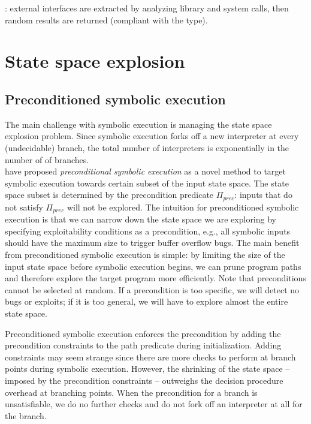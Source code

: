 \cite{DART-PLDI05}: external interfaces are extracted by analyzing library and system calls, then random results are returned (compliant with the type).

\section{State space explosion}

\subsection{Preconditioned symbolic execution~\cite{AEG-NDSS11}}
\label{precontioned-symbolic-execution}

The main challenge with symbolic execution is managing the state space explosion problem. Since symbolic execution forks off a new interpreter at every (undecidable) branch, the total number of interpreters is exponentially in the number of of branches.\\

\cite{AEG-NDSS11} have proposed {\em preconditional symbolic execution} as a novel method to target symbolic execution towards certain subset of the input state space. The state space subset is determined by the precondition predicate $\Pi_{prec}$: inputs that do not satisfy $\Pi_{prec}$ will not be explored. The intuition for preconditioned symbolic execution is that we can narrow down the state space we are exploring by specifying exploitability conditions as a precondition, e.g., all symbolic inputs should have the maximum size to trigger buffer overflow bugs. The main benefit from preconditioned symbolic execution is simple: by limiting the size of the input state space before symbolic execution begins, we can prune program paths and therefore explore the target program more efficiently.
Note that preconditions cannot be selected at random. If a precondition is too specific, we will detect no bugs or exploits; if it is too general, we will have to explore almost the entire state space. %

Preconditioned symbolic execution enforces the precondition by adding the precondition constraints to the path predicate during initialization. Adding constraints may seem strange since there are more checks to perform at branch points during symbolic execution. However, the shrinking of the state space -- imposed by the precondition constraints -- outweighs the decision procedure overhead at branching points. When the precondition for a branch is unsatisfiable, we do no further checks and do not fork off an interpreter at all for the branch.%

